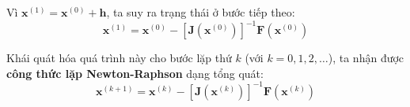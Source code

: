 Vì $\mathbf{x}^{(1)} = \mathbf{x}^{(0)} + \mathbf{h}$, ta suy ra trạng thái ở bước tiếp theo:
\begin{equation}
    \mathbf{x}^{(1)} = \mathbf{x}^{(0)} - [\mathbf{J}(\mathbf{x}^{(0)})]^{-1} \mathbf{F}(\mathbf{x}^{(0)})
\end{equation}

Khái quát hóa quá trình này cho bước lặp thứ $k$ (với $k = 0, 1, 2, \dots$), ta nhận được \textbf{công thức lặp Newton-Raphson} dạng tổng quát:
\begin{equation}
    \mathbf{x}^{(k+1)} = \mathbf{x}^{(k)} - [\mathbf{J}(\mathbf{x}^{(k)})]^{-1} \mathbf{F}(\mathbf{x}^{(k)})
    \label{eq:newton_raphson_general}
\end{equation}





    
